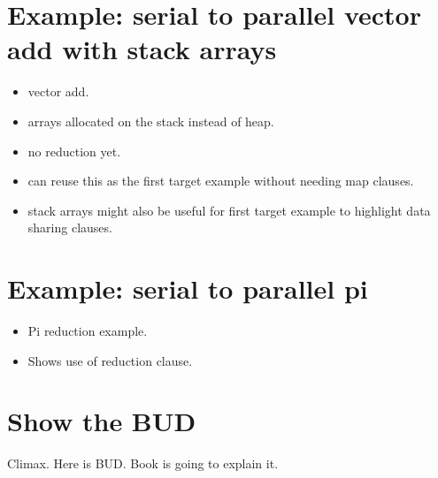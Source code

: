 \section{Example: serial to parallel vector add with stack arrays}
\begin{itemize}
  \item vector add.
  \item arrays allocated on the stack instead of heap.
  \item no reduction yet.
  \item can reuse this as the first target example without needing map clauses.
  \item stack arrays might also be useful for first target example to highlight data sharing clauses.
\end{itemize}

\section{Example: serial to parallel pi}
\begin{itemize}
  \item Pi reduction example.
  \item Shows use of reduction clause.
\end{itemize}

\section{Show the BUD}
Climax. Here is BUD. Book is going to explain it.




